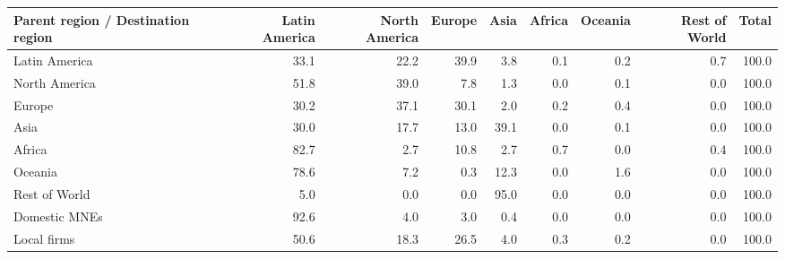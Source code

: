 \begin{tabular}{lrrrrrrrr}
\toprule
Parent region / Destination region & Latin America & North America & Europe & Asia & Africa & Oceania & Rest of World & Total \\
\midrule
Latin America & 33.1 & 22.2 & 39.9 & 3.8 & 0.1 & 0.2 & 0.7 & 100.0 \\
North America & 51.8 & 39.0 & 7.8 & 1.3 & 0.0 & 0.1 & 0.0 & 100.0 \\
Europe & 30.2 & 37.1 & 30.1 & 2.0 & 0.2 & 0.4 & 0.0 & 100.0 \\
Asia & 30.0 & 17.7 & 13.0 & 39.1 & 0.0 & 0.1 & 0.0 & 100.0 \\
Africa & 82.7 & 2.7 & 10.8 & 2.7 & 0.7 & 0.0 & 0.4 & 100.0 \\
Oceania & 78.6 & 7.2 & 0.3 & 12.3 & 0.0 & 1.6 & 0.0 & 100.0 \\
Rest of World & 5.0 & 0.0 & 0.0 & 95.0 & 0.0 & 0.0 & 0.0 & 100.0 \\
Domestic MNEs & 92.6 & 4.0 & 3.0 & 0.4 & 0.0 & 0.0 & 0.0 & 100.0 \\
Local firms & 50.6 & 18.3 & 26.5 & 4.0 & 0.3 & 0.2 & 0.0 & 100.0 \\
\bottomrule
\end{tabular}
